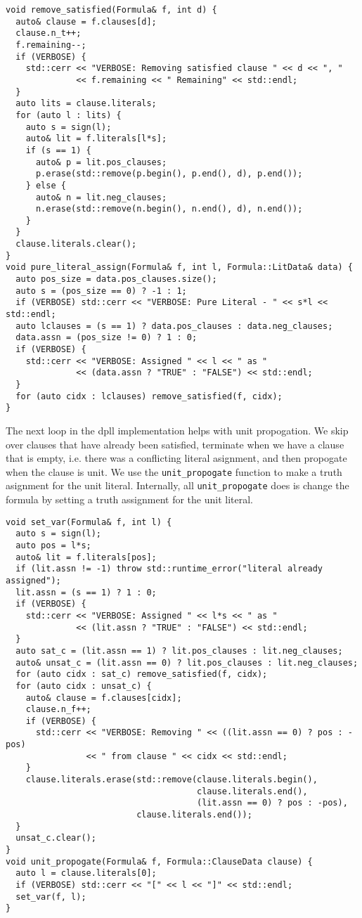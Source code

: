 \documentclass[10pt,AMS Euler]{article}
\begin{document}
\begin{verbatim}
void remove_satisfied(Formula& f, int d) {
  auto& clause = f.clauses[d];
  clause.n_t++;
  f.remaining--;
  if (VERBOSE) {
    std::cerr << "VERBOSE: Removing satisfied clause " << d << ", "
              << f.remaining << " Remaining" << std::endl;
  }
  auto lits = clause.literals;
  for (auto l : lits) {
    auto s = sign(l);
    auto& lit = f.literals[l*s];
    if (s == 1) {
      auto& p = lit.pos_clauses;
      p.erase(std::remove(p.begin(), p.end(), d), p.end());
    } else {
      auto& n = lit.neg_clauses;
      n.erase(std::remove(n.begin(), n.end(), d), n.end());
    }
  }
  clause.literals.clear();
}
void pure_literal_assign(Formula& f, int l, Formula::LitData& data) {
  auto pos_size = data.pos_clauses.size();
  auto s = (pos_size == 0) ? -1 : 1;
  if (VERBOSE) std::cerr << "VERBOSE: Pure Literal - " << s*l << std::endl;
  auto lclauses = (s == 1) ? data.pos_clauses : data.neg_clauses;
  data.assn = (pos_size != 0) ? 1 : 0;
  if (VERBOSE) {
    std::cerr << "VERBOSE: Assigned " << l << " as "
              << (data.assn ? "TRUE" : "FALSE") << std::endl;
  }
  for (auto cidx : lclauses) remove_satisfied(f, cidx);
}
\end{verbatim}

The next loop in the dpll implementation helps with unit propogation.
We skip over clauses that have already been satisfied, terminate when we
have a clause that is empty, i.e. there was a conflicting literal asignment,
and then propogate when the clause is unit. We use the \texttt{unit\_propogate} function to
make a truth asignment for the unit literal. Internally, all \texttt{unit\_propogate}
does is change the formula by setting a truth assignment for the unit literal.
\begin{verbatim}
void set_var(Formula& f, int l) {
  auto s = sign(l);
  auto pos = l*s;
  auto& lit = f.literals[pos];
  if (lit.assn != -1) throw std::runtime_error("literal already assigned");
  lit.assn = (s == 1) ? 1 : 0;
  if (VERBOSE) {
    std::cerr << "VERBOSE: Assigned " << l*s << " as "
              << (lit.assn ? "TRUE" : "FALSE") << std::endl;
  }
  auto sat_c = (lit.assn == 1) ? lit.pos_clauses : lit.neg_clauses;
  auto& unsat_c = (lit.assn == 0) ? lit.pos_clauses : lit.neg_clauses;
  for (auto cidx : sat_c) remove_satisfied(f, cidx);
  for (auto cidx : unsat_c) {
    auto& clause = f.clauses[cidx];
    clause.n_f++;
    if (VERBOSE) {
      std::cerr << "VERBOSE: Removing " << ((lit.assn == 0) ? pos : -pos)
                << " from clause " << cidx << std::endl;
    }
    clause.literals.erase(std::remove(clause.literals.begin(),
                                      clause.literals.end(),
                                      (lit.assn == 0) ? pos : -pos),
                          clause.literals.end());
  }
  unsat_c.clear();
}
void unit_propogate(Formula& f, Formula::ClauseData clause) {
  auto l = clause.literals[0];
  if (VERBOSE) std::cerr << "[" << l << "]" << std::endl;
  set_var(f, l);
}
\end{verbatim}
\end{document}
